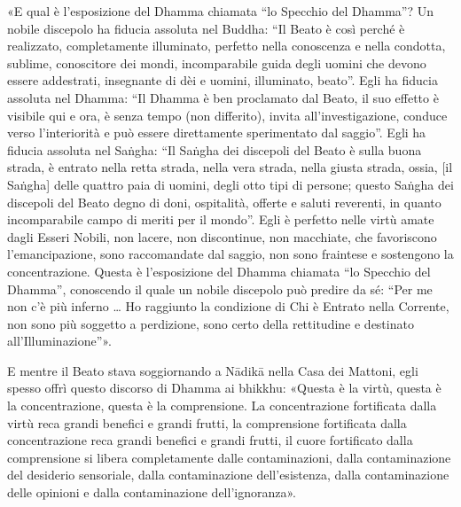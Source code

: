 «E qual è l’esposizione del Dhamma chiamata “lo Specchio del Dhamma”? Un nobile
discepolo ha fiducia assoluta nel Buddha: “Il Beato è così perché è realizzato,
completamente illuminato, perfetto nella conoscenza e nella condotta, sublime,
conoscitore dei mondi, incomparabile guida degli uomini che devono essere
addestrati, insegnante di dèi e uomini, illuminato, beato”. Egli ha fiducia
assoluta nel Dhamma: “Il Dhamma è ben proclamato dal Beato, il suo effetto è
visibile qui e ora, è senza tempo (non differito), invita all’investigazione,
conduce verso l’interiorità e può essere direttamente sperimentato dal saggio”.
Egli ha fiducia assoluta nel Saṅgha: “Il Saṅgha dei discepoli del Beato è sulla
buona strada, è entrato nella retta strada, nella vera strada, nella giusta
strada, ossia, [il Saṅgha] delle quattro paia di uomini, degli otto tipi di
persone;
questo Saṅgha dei discepoli del Beato degno di doni, ospitalità, offerte e
saluti reverenti, in quanto incomparabile campo di meriti per il mondo”. Egli è
perfetto nelle virtù amate dagli Esseri Nobili, non lacere, non discontinue, non
macchiate, che favoriscono l’emancipazione, sono raccomandate dal saggio, non
sono fraintese e sostengono la concentrazione. Questa è l’esposizione del Dhamma
chiamata “lo Specchio del Dhamma”, conoscendo il quale un nobile discepolo può
predire da sé: “Per me non c’è più inferno … Ho raggiunto la condizione di Chi è
Entrato nella Corrente, non sono più soggetto a perdizione, sono certo della
rettitudine e destinato all’Illuminazione”».

E mentre il Beato stava soggiornando a Nādikā nella Casa dei Mattoni, egli
spesso offrì questo discorso di Dhamma ai bhikkhu: «Questa è la virtù, questa è
la concentrazione, questa è la comprensione. La concentrazione fortificata dalla
virtù reca grandi benefici e grandi frutti, la comprensione fortificata dalla
concentrazione reca grandi benefici e grandi frutti, il cuore fortificato dalla
comprensione si libera completamente dalle contaminazioni, dalla contaminazione
del desiderio sensoriale, dalla contaminazione dell’esistenza, dalla
contaminazione delle opinioni e dalla contaminazione dell’ignoranza».


